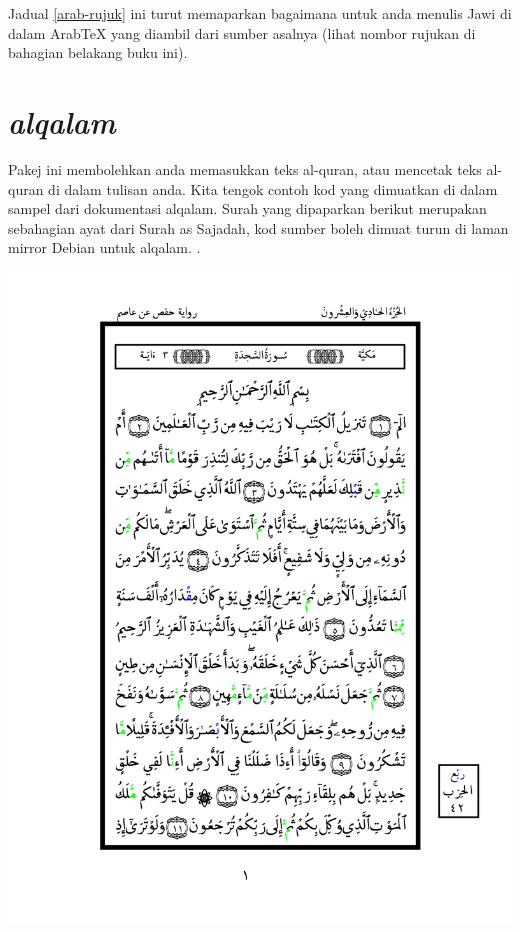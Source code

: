 Jadual \ref{arab-rujuk} ini turut memaparkan bagaimana untuk anda menulis Jawi di dalam Arab\TeX{} yang diambil dari sumber asalnya (lihat nombor rujukan di bahagian belakang buku ini)\cite{paut-arab}.


\section{\emph{alqalam}}
Pakej ini membolehkan anda memasukkan teks al-quran, atau mencetak teks al-quran di dalam tulisan anda.
Kita tengok contoh kod yang dimuatkan di dalam sampel dari dokumentasi alqalam. Surah yang dipaparkan berikut merupakan sebahagian ayat dari
Surah as Sajadah, kod sumber \latex{} boleh dimuat turun di laman mirror Debian untuk alqalam.%
\cite{paut-kalam}.
%

%


\begin{minipage}{\linewidth}
\begin{center}

\includegraphics[scale=0.7]{sajdah_1.png}
\end{center}
\end{minipage}

